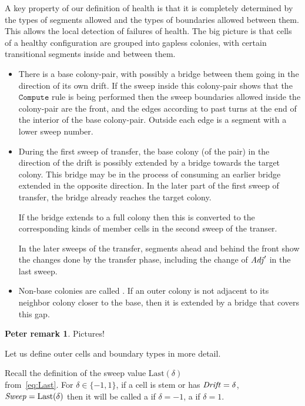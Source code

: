 \documentclass[11pt]{memoir}
\newcommand{\authnote}[3]
{\text{{ \textcolor{#3}{\( \langle\hspace{-0.2em}\langle \)\textsf{\footnotesize #1: #2}\( \rangle\hspace{-0.2em}\rangle \)}}}}
\newcommand{\authnote}[2]{}
\newcommand{\Pnote}[1]{{\authnote{P}{#1}{cyan}}}
\theoremstyle{definition} %
\newtheorem{Premark}{\color{cyan}Peter remark}
\newenvironment{premark}{\begin{Premark}\color{cyan}}{\varqed\end{Premark}}
\renewcommand{\Pnote}[1]{\begin{premark}#1\end{premark}}
\newcommand{\fld}[1]{\ensuremath{\textit{#1\/}}}
\newcommand{\rul}[1]{\ensuremath{\texttt{#1}}}
\newcommand{\Drift}{\fld{Drift}}
\newcommand{\Adj}{\fld{Adj}}
\newcommand{\Sweep}{\fld{Sweep}}
\newcommand{\Last}{\mathrm{Last}}
\newcommand{\Comp}{\rul{Compute}}
\begin{document}
A key property of our definition of health is that it is completely determined by the
types of segments allowed and the types of boundaries allowed between them.
This allows the local detection of failures of health.
The big picture is that cells of a healthy configuration are grouped into gapless colonies, with
certain transitional segments inside and between them.
\begin{itemize}
\item There is a base colony-pair, with possibly a bridge between them going in the direction
  of its own drift.
  If the sweep inside this colony-pair shows that the \( \Comp \) rule is being performed then
  the sweep boundaries allowed inside the colony-pair are the front, and the edges
  according to past turns at the end of the interior of the base colony-pair.
  Outside each edge is a segment with a lower sweep number.

\item  During the first sweep of transfer, the base colony (of the pair)
  in the direction of the drift is possibly extended by a bridge towards the target colony.
  This bridge may be in the process of consuming an earlier bridge extended in the opposite direction.
  In the later part of the first sweep of transfer, the bridge already reaches
  the target colony.

  If the bridge extends to a full colony then this is converted to the corresponding kinds of member
  cells in the second sweep of the transer.

  In the later sweeps of the transfer, segments ahead and behind the front show the changes done
  by the transfer phase, including the change of \( \Adj' \) in the last sweep.
  
\item Non-base colonies are called .
If an outer colony is not adjacent to its neighbor colony closer to the base,
then it is extended by a bridge that covers this gap.

\end{itemize}
\Pnote{Pictures!}

Let us define outer cells and boundary types in more detail.

\begin{definition}\label{def:outer-cells}
    Recall the definition of the sweep value
    \(  \Last(\delta)  \) \\ from~\eqref{eq:Last}.
    For \( \delta \in \{ -1,1 \} \), if a cell is stem or has
\( \Drift = \delta \),  \( \Sweep = \Last(\delta) \)
    then it will be called a  if
    \( \delta = -1 \), a  if \( \delta = 1 \).
\end{definition}
\end{document}
